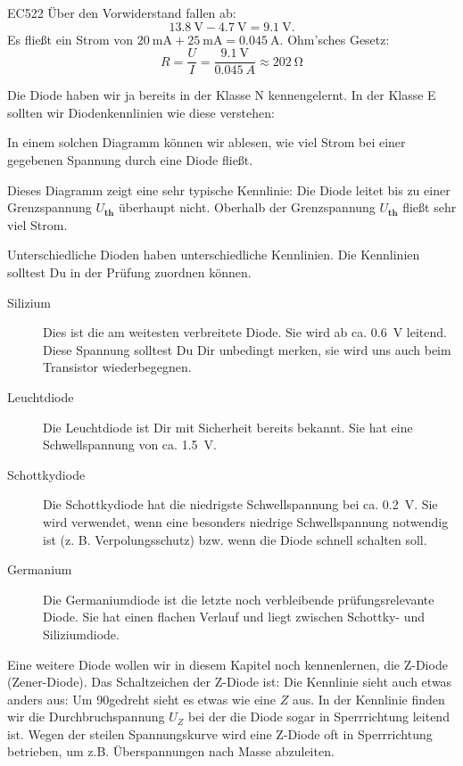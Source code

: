 \begin{sol}{EC522}
  Über den Vorwiderstand fallen ab:
     $$\SI{13.8}{\volt} - \SI{4.7}{\volt} = \SI{9.1}{\volt}.$$
  Es fließt ein Strom von 
  $\SI{20}{\milli\ampere}+
   \SI{25}{\milli\ampere}=\SI{0.045}{\ampere}.$
  Ohm’sches Gesetz:
    $$R=\frac{U}{I} = \frac{\SI{9.1}{\volt}}{\SI{0.045}{A}} \approx  \SI{202}{\ohm}$$     
\end{sol}


\begin{ohmchapter}
  Die Diode haben wir ja bereits in der Klasse N kennengelernt.
  In der Klasse E sollten wir Diodenkennlinien wie diese verstehen:

  In einem solchen Diagramm können wir ablesen, wie viel Strom bei einer gegebenen Spannung durch eine Diode fließt. 

Dieses Diagramm zeigt eine sehr typische Kennlinie: Die Diode leitet bis zu einer Grenzspannung $U_\textbf{th}$ überhaupt nicht.
Oberhalb der Grenzspannung $U_\textbf{th}$ fließt sehr viel Strom.

  Unterschiedliche Dioden haben unterschiedliche Kennlinien. Die Kennlinien solltest Du in der Prüfung zuordnen können.

  \begin{description}
    \item[Silizium] Dies ist die am weitesten verbreitete Diode. Sie wird ab ca. \SI{0.6}{\volt} leitend. Diese Spannung solltest Du Dir unbedingt merken, sie wird uns auch beim Transistor wiederbegegnen.
    \item[Leuchtdiode] Die Leuchtdiode ist Dir mit Sicherheit bereits bekannt. Sie hat eine Schwellspannung von ca. \SI{1,5}{\volt}. 
    \item[Schottkydiode] Die Schottkydiode hat die niedrigste Schwellspannung bei ca.  \SI{0.2}{\volt}. Sie wird verwendet, wenn eine besonders niedrige Schwellspannung notwendig ist (z. B. Verpolungsschutz) bzw. wenn die Diode schnell schalten soll.
    \item[Germanium] Die Germaniumdiode ist die letzte noch verbleibende prüfungsrelevante Diode. Sie hat einen flachen Verlauf und liegt zwischen Schottky- und Siliziumdiode.
  \end{description}

  Eine weitere Diode wollen wir in diesem Kapitel noch kennenlernen, die Z-Diode (Zener-Diode).
  Das Schaltzeichen der Z-Diode ist:
  Die Kennlinie sieht auch etwas anders aus:
   Um 90\textdegree gedreht sieht es etwas wie eine $Z$ aus.
   In der Kennlinie finden wir die Durchbruchspannung $U_Z$ bei der die Diode sogar in Sperrrichtung leitend ist. Wegen der steilen Spannungskurve wird eine Z-Diode oft in Sperrrichtung betrieben, um z.B. Überspannungen nach Masse abzuleiten.


\end{ohmchapter}



